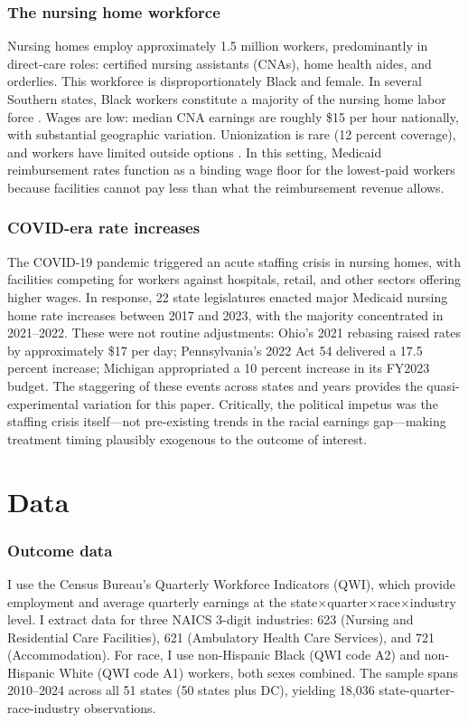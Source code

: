 \documentclass[12pt]{article}
\begin{document}
\subsubsection*{The nursing home workforce}  Nursing homes employ approximately 1.5 million workers, predominantly in direct-care roles: certified nursing assistants (CNAs), home health aides, and orderlies. This workforce is disproportionately Black and female. In several Southern states, Black workers constitute a majority of the nursing home labor force \citep{PHI2022}. Wages are low: median CNA earnings are roughly \$15 per hour nationally, with substantial geographic variation. Unionization is rare (12 percent coverage), and workers have limited outside options \citep{BLS2023}. In this setting, Medicaid reimbursement rates function as a binding wage floor for the lowest-paid workers because facilities cannot pay less than what the reimbursement revenue allows.

\subsubsection*{COVID-era rate increases}  The COVID-19 pandemic triggered an acute staffing crisis in nursing homes, with facilities competing for workers against hospitals, retail, and other sectors offering higher wages. In response, 22 state legislatures enacted major Medicaid nursing home rate increases between 2017 and 2023, with the majority concentrated in 2021--2022. These were not routine adjustments: Ohio's 2021 rebasing raised rates by approximately \$17 per day; Pennsylvania's 2022 Act 54 delivered a 17.5 percent increase; Michigan appropriated a 10 percent increase in its FY2023 budget. The staggering of these events across states and years provides the quasi-experimental variation for this paper. Critically, the political impetus was the staffing crisis itself---not pre-existing trends in the racial earnings gap---making treatment timing plausibly exogenous to the outcome of interest.

\section{Data}

\subsubsection*{Outcome data}  I use the Census Bureau's Quarterly Workforce Indicators (QWI), which provide employment and average quarterly earnings at the state$\times$quarter$\times$race$\times$industry level. I extract data for three NAICS 3-digit industries: 623 (Nursing and Residential Care Facilities), 621 (Ambulatory Health Care Services), and 721 (Accommodation). For race, I use non-Hispanic Black (QWI code A2) and non-Hispanic White (QWI code A1) workers, both sexes combined. The sample spans 2010--2024 across all 51 states (50 states plus DC), yielding 18,036 state-quarter-race-industry observations.
\end{document}
